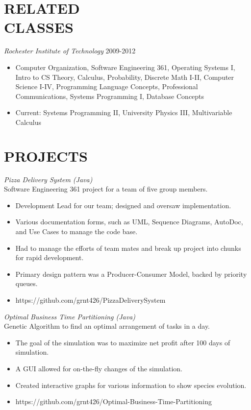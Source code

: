 \documentclass[line,margin]{res}
\begin{document}
\begin{resume}
\section{RELATED \\ CLASSES} {\sl Rochester Institute of Technology} \hfill 2009-2012
                 \begin{itemize}  \itemsep -2pt %
	\item Computer Organization, Software Engineering 361, Operating Systems I, Intro to CS Theory, 
		Calculus, Probability, Discrete Math I-II, Computer Science I-IV, Programming Language Concepts,
		Professional Communications, Systems Programming I, Database Concepts
	\item Current: Systems Programming II, University Physics III, Multivariable Calculus
	\end{itemize}
 
 
\section{PROJECTS}  

	{\sl Pizza Delivery System (Java)} \\
	Software Engineering 361 project for a team of five group members.
	  \begin{itemize}  \itemsep -2pt %
	\item Development Lead for our team; designed and oversaw implementation.
	\item Various documentation forms, such as UML, Sequence Diagrams, AutoDoc, and Use Cases to manage the code base.
	\item Had to manage the efforts of team mates and break up project into chunks for rapid development.
	\item Primary design pattern was a Producer-Consumer Model, backed by priority queues.
	\item https://github.com/grnt426/PizzaDeliverySystem
                \end{itemize}

	{\sl Optimal Business Time Partitioning (Java)} \\
	Genetic Algorithm to find an optimal arrangement of tasks in a day.
	  \begin{itemize}  \itemsep -2pt %
	\item The goal of the simulation was to maximize net profit after 100 days of simulation.
	\item A GUI allowed for on-the-fly changes of the simulation.
	\item Created interactive graphs for various information to show species evolution.
	\item https://github.com/grnt426/Optimal-Business-Time-Partitioning
                \end{itemize}


\end{resume}
\end{document}
